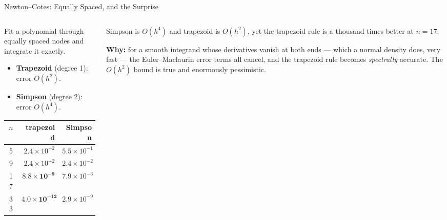 \begin{frame}{Newton--Cotes: Equally Spaced, and the Surprise}
\begin{columns}[T]
\begin{column}{0.51\textwidth}
\small
Fit a polynomial through equally spaced nodes and integrate it exactly.
\begin{itemize}\footnotesize
  \item \textbf{Trapezoid} (degree 1): error $O(h^{2})$.
  \item \textbf{Simpson} (degree 2): error $O(h^{4})$.
\end{itemize}
\medskip
\begin{center}\footnotesize
\begin{tabularx}{\linewidth}{@{}c r r@{}}
\toprule
$n$ & \textbf{trapezoid} & \textbf{Simpson} \\
\midrule
5 & $2.4\times10^{-2}$ & $5.5\times10^{-1}$ \\
9 & $2.4\times10^{-2}$ & $2.4\times10^{-2}$ \\
17 & $\mathbf{8.8\times10^{-9}}$ & $7.9\times10^{-3}$ \\
33 & $\mathbf{4.0\times10^{-12}}$ & $2.9\times10^{-9}$ \\
\bottomrule
\end{tabularx}
\end{center}
\end{column}
\begin{column}{0.46\textwidth}
\begin{cautionbox}[title=\textbf{The higher-order rule loses}]\small
Simpson is $O(h^{4})$ and trapezoid is $O(h^{2})$, yet the trapezoid rule is a thousand times better at $n=17$.
\end{cautionbox}
\medskip
\begin{takeawaybox}\footnotesize
\textbf{Why:} for a smooth integrand whose derivatives vanish at both ends --- which a normal density does, very fast --- the Euler--Maclaurin error terms all cancel, and the trapezoid rule becomes \emph{spectrally} accurate. The $O(h^{2})$ bound is true and enormously pessimistic.
\end{takeawaybox}
\end{column}
\end{columns}
\vspace{1mm}
\end{frame}

